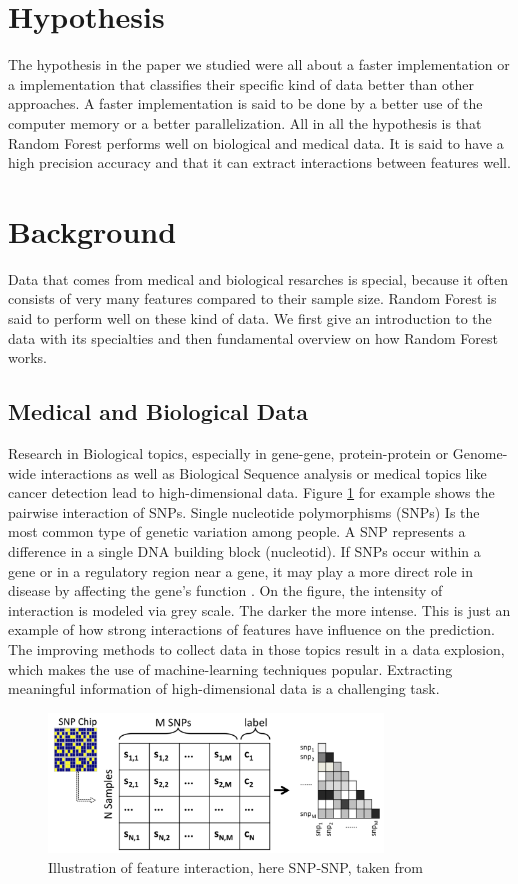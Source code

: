 \documentclass{sig-alternate-05-2015}
\begin{document}
\section{Hypothesis}
The hypothesis in the paper we studied were all about a faster implementation or a implementation that classifies their specific kind of data better than other approaches. A faster implementation is said to be done by a better use of the computer memory or a better parallelization. All in all the hypothesis is that Random Forest performs well on biological and medical data. It is said to have a high precision accuracy and that it can extract interactions between features well.

\section{Background}
Data that comes from medical and biological resarches is special, because it often consists of very many features compared to their sample size. Random Forest is said to perform well on these kind of data. We first give an introduction to the data with its specialties and then fundamental overview on how Random Forest works.

\subsection{Medical and Biological Data}
Research in Biological topics, especially in gene-gene, protein-protein or Genome-wide interactions as well as Biological Sequence analysis or medical topics like cancer detection lead to high-dimensional data.
Figure \ref{fig:snpmatrice} for example shows the pairwise interaction of SNPs.
Single nucleotide polymorphisms (SNPs) Is the most common type of genetic variation among people. A SNP represents a difference in a single DNA building block (nucleotid). If SNPs occur within a gene or in a regulatory region near a gene, it may play a more direct role in disease by affecting the gene's function \cite{snp2016mih}.
On the figure, the intensity of interaction is modeled via grey scale. The darker the more intense. This is just an example of how strong interactions of features have influence on the prediction.
The improving methods to collect data in those topics result in a data explosion, which makes the use of machine-learning techniques popular. Extracting meaningful information of high-dimensional data is a challenging task.

\begin{figure}
\centering
\includegraphics[width=3.5in]{snpmatrice}
\caption{Illustration of feature interaction, here SNP-SNP, taken from \cite{qi2012random}}
\label{fig:snpmatrice}
\end{figure}
\end{document}
